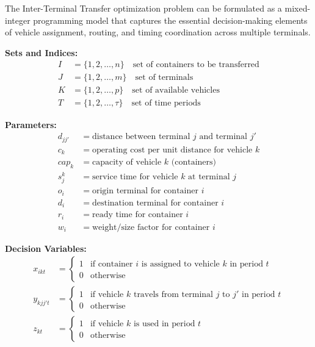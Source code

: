 \documentclass{article}
\begin{document}
The Inter-Terminal Transfer optimization problem can be formulated as a mixed-integer programming model that captures the essential decision-making elements of vehicle assignment, routing, and timing coordination across multiple terminals.

\textbf{Sets and Indices:}
\begin{align}
I &= \{1, 2, \ldots, n\} \quad \text{set of containers to be transferred}\\
J &= \{1, 2, \ldots, m\} \quad \text{set of terminals}\\
K &= \{1, 2, \ldots, p\} \quad \text{set of available vehicles}\\
T &= \{1, 2, \ldots, \tau\} \quad \text{set of time periods}
\end{align}

\textbf{Parameters:}
\begin{align}
d_{jj'} &= \text{distance between terminal } j \text{ and terminal } j'\\
c_k &= \text{operating cost per unit distance for vehicle } k\\
cap_k &= \text{capacity of vehicle } k \text{ (containers)}\\
s_{j}^{k} &= \text{service time for vehicle } k \text{ at terminal } j\\
o_i &= \text{origin terminal for container } i\\
d_i &= \text{destination terminal for container } i\\
r_i &= \text{ready time for container } i\\
w_i &= \text{weight/size factor for container } i
\end{align}

\textbf{Decision Variables:}
\begin{align}
x_{ikt} &= \begin{cases} 
1 & \text{if container } i \text{ is assigned to vehicle } k \text{ in period } t\\
0 & \text{otherwise}
\end{cases}\\
y_{kjj't} &= \begin{cases}
1 & \text{if vehicle } k \text{ travels from terminal } j \text{ to } j' \text{ in period } t\\
0 & \text{otherwise}
\end{cases}\\
z_{kt} &= \begin{cases}
1 & \text{if vehicle } k \text{ is used in period } t\\
0 & \text{otherwise}
\end{cases}
\end{align}
\end{document}
